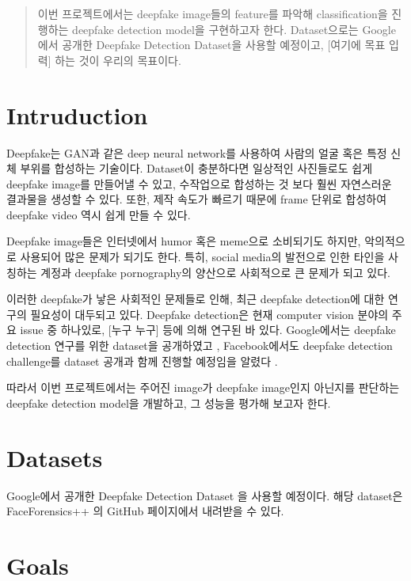 \documentclass{article}
\begin{document}
\begin{abstract}
이번 프로젝트에서는 deepfake image들의 feature를 파악해  classification을 진행하는 deepfake detection model을 구현하고자 한다. Dataset으로는 Google에서 공개한 Deepfake Detection Dataset을 사용할 예정이고, [여기에 목표 입력] 하는 것이 우리의 목표이다.
\end{abstract}

\section{Intruduction}

Deepfake는 GAN과 같은 deep neural network를 사용하여 사람의 얼굴 혹은 특정 신체 부위를 합성하는 기술이다. Dataset이 충분하다면 일상적인 사진들로도 쉽게 deepfake image를 만들어낼 수 있고, 수작업으로 합성하는 것 보다 훨씬 자연스러운 결과물을 생성할 수 있다. 또한, 제작 속도가 빠르기 때문에 frame 단위로 합성하여 deepfake video 역시 쉽게 만들 수 있다.

Deepfake image들은 인터넷에서 humor 혹은 meme으로 소비되기도 하지만, 악의적으로 사용되어 많은 문제가 되기도 한다. 특히, social media의 발전으로 인한 타인을 사칭하는 계정과 deepfake pornography의 양산으로 사회적으로 큰 문제가 되고 있다.

이러한 deepfake가 낳은 사회적인 문제들로 인해, 최근 deepfake detection에 대한 연구의 필요성이 대두되고 있다. Deepfake detection은 현재 computer vision 분야의 주요 issue 중 하나있로, [누구 누구] 등에 의해 연구된 바 있다. Google에서는 deepfake detection 연구를 위한 dataset을 공개하였고 \cite{googleblog}, Facebook에서도 deepfake detection challenge를 dataset 공개과 함께 진행할 예정임을 알렸다 \cite{facebookblog}.

따라서 이번 프로젝트에서는 주어진 image가 deepfake image인지 아닌지를 판단하는 deepfake detection model을 개발하고, 그 성능을 평가해 보고자 한다.

\section{Datasets}

Google에서 공개한 Deepfake Detection Dataset \cite{DDD_GoogleJigSaw2019} 을 사용할 예정이다. 해당 dataset은 FaceForensics++ \cite{roessler2019faceforensicspp}의 GitHub 
페이지에서 내려받을 수 있다.

\section{Goals}
\end{document}
